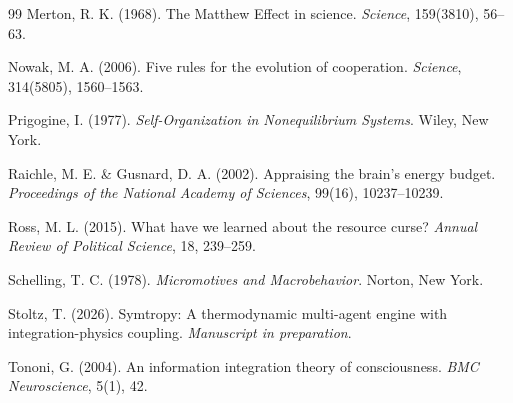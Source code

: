 \documentclass[12pt,a4paper]{article}
\begin{document}
\begin{thebibliography}{99}
Merton, R. K. (1968).
The Matthew Effect in science.
\emph{Science}, 159(3810), 56--63.

Nowak, M. A. (2006).
Five rules for the evolution of cooperation.
\emph{Science}, 314(5805), 1560--1563.

Prigogine, I. (1977).
\emph{Self-Organization in Nonequilibrium Systems}.
Wiley, New York.

Raichle, M. E. \& Gusnard, D. A. (2002).
Appraising the brain's energy budget.
\emph{Proceedings of the National Academy of Sciences}, 99(16), 10237--10239.

Ross, M. L. (2015).
What have we learned about the resource curse?
\emph{Annual Review of Political Science}, 18, 239--259.

Schelling, T. C. (1978).
\emph{Micromotives and Macrobehavior}.
Norton, New York.

Stoltz, T. (2026).
Symtropy: A thermodynamic multi-agent engine with integration-physics coupling.
\emph{Manuscript in preparation}.

Tononi, G. (2004).
An information integration theory of consciousness.
\emph{BMC Neuroscience}, 5(1), 42.

\end{thebibliography}
\end{document}

